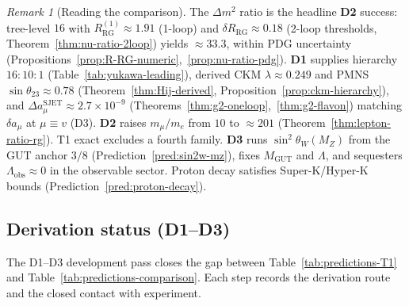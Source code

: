 \documentclass[aps,prd,onecolumn,amsmath,amssymb,nofootinbib,11pt]{revtex4-2}
\numberwithin{equation}{section}
\theoremstyle{plain}
\theoremstyle{definition}
\theoremstyle{remark}
\newtheorem{remark}[theorem]{Remark}
\begin{document}
\begin{remark}[Reading the comparison]
The $\Delta m^2$ ratio is the headline \textbf{D2} success: tree-level $16$
with $R_{\mathrm{RG}}^{(1)}\approx 1.91$ (1-loop) and
$\delta R_{\mathrm{RG}}\approx 0.18$ (2-loop thresholds,
Theorem~\ref{thm:nu-ratio-2loop}) yields $\approx 33.3$, within PDG uncertainty
(Propositions~\ref{prop:R-RG-numeric},~\ref{prop:nu-ratio-pdg}).
\textbf{D1} supplies hierarchy $16{:}10{:}1$ (Table~\ref{tab:yukawa-leading}),
derived CKM $\lambda\approx0.249$ and PMNS $\sin\theta_{23}\approx0.78$
(Theorem~\ref{thm:Hij-derived}, Proposition~\ref{prop:ckm-hierarchy}), and
$\Delta a_\mu^{\mathrm{SJET}}\approx2.7\times10^{-9}$
(Theorems~\ref{thm:g2-oneloop},~\ref{thm:g2-flavon}) matching $\delta a_\mu$
at $\mu\equiv v$ (D3).
\textbf{D2} raises $m_\mu/m_e$ from $10$ to $\approx201$
(Theorem~\ref{thm:lepton-ratio-rg}). T1 exact excludes a fourth family.
\textbf{D3} runs $\sin^2\theta_W(M_Z)$ from the GUT anchor $3/8$
(Prediction~\ref{pred:sin2w-mz}), fixes $M_{\mathrm{GUT}}$ and $\Lambda$,
and sequesters $\Lambda_{\mathrm{obs}}\approx 0$ in the observable sector.
Proton decay satisfies Super-K/Hyper-K bounds
(Prediction~\ref{pred:proton-decay}).
\end{remark}

\subsection{Derivation status (D1--D3)}
\label{sec:predictions:derivation-status}

The D1--D3 development pass closes the gap between Table~\ref{tab:predictions-T1}
and Table~\ref{tab:predictions-comparison}. Each step records the derivation
route and the closed contact with experiment.
\end{document}
